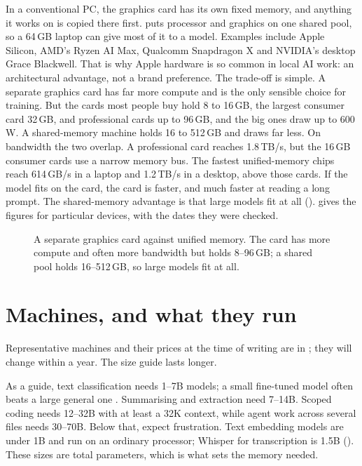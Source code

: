 In a conventional PC, the graphics card has its own fixed memory, and anything
it works on is copied there first.  puts processor and
graphics on one shared pool, so a 64\,GB laptop can give most of it to a model.
Examples include Apple Silicon, AMD's Ryzen AI Max, Qualcomm Snapdragon X and
NVIDIA's desktop Grace Blackwell. That is why Apple hardware is so common in
local AI work: an architectural advantage, not a brand preference. The
trade-off is simple. A separate graphics card has far more compute and is the
only sensible choice for training. But the cards most people buy hold 8 to
16\,GB, the largest consumer card 32\,GB, and professional cards up to 96\,GB,
and the big ones draw up to 600\,W. A shared-memory machine holds 16 to
512\,GB and draws far less. On bandwidth the two overlap. A professional card
reaches 1.8\,TB/s, but the 16\,GB consumer cards use a narrow memory bus. The
fastest unified-memory chips reach 614\,GB/s in a laptop and 1.2\,TB/s in a
desktop, above those cards. If the model fits on the card, the card is faster,
and much faster at reading a long prompt. The shared-memory advantage is that
large models fit at all ().  gives the
figures for particular devices, with the dates they were checked.

\begin{figure}[htbp]
\centering
{}
\caption{A separate graphics card against unified memory. The card has more
compute and often more bandwidth but holds 8--96\,GB; a shared pool holds
16--512\,GB, so large models fit at all.}
\label{fig:unified}
\end{figure}

\section{Machines, and what they run}

Representative machines and their prices at the time of writing are in
; they will change within a year. The size guide lasts
longer.

As a guide, text classification needs 1--7B models; a small fine-tuned model
often beats a large general one \parencite{chen2025bionlp}. Summarising and
extraction need 7--14B. Scoped coding needs 12--32B with at least a 32K
context, while agent work across several files needs 30--70B. Below that,
expect frustration. Text embedding models are under 1B and run on an ordinary
processor; Whisper for transcription is 1.5B (). These sizes
are total parameters, which is what sets the memory needed.

